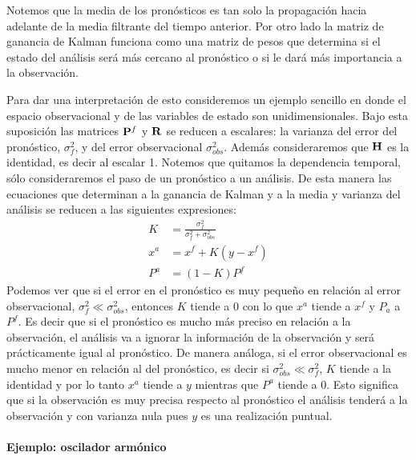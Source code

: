 Notemos que la media de los pronósticos es tan solo la propagación hacia adelante de la media filtrante del tiempo anterior. Por otro lado la matriz de ganancia de Kalman funciona como una matriz de pesos que determina si el estado del análisis será más cercano al pronóstico o si le dará más importancia a la observación.

Para dar una interpretación de esto consideremos un ejemplo sencillo en donde el espacio observacional y de las variables de estado son unidimensionales. Bajo esta suposición las matrices $\mathbf{P}^f$ y $\mathbf{R}$ se reducen a escalares: la varianza del error del pronóstico, $\sigma_f^2$, y del error observacional $\sigma_{obs}^2$. Además consideraremos que $\mathbf{H}$ es la identidad, es decir al escalar 1. Notemos que quitamos la dependencia temporal, sólo consideraremos el paso de un pronóstico a un análisis. De esta manera las ecuaciones que determinan a la ganancia de Kalman y a la media y varianza del análisis se reducen a las siguientes expresiones:
\begin{align}
    K &= \frac{\sigma_f^2}{\sigma_f^2 + \sigma_{obs}^2} \\ 
    x^a &=  x^f + K (y - x^f) \\ 
    P^a &= (1 - K)  P^f
\end{align}
Podemos ver que si el error en el pronóstico es muy pequeño en relación al error observacional, $\sigma_f^2 \ll \sigma_{obs}^2$, entonces $K$ tiende a 0 con lo que $x^a$ tiende a $x^f$ y $P_a$ a $P^f$. Es decir que si el pronóstico es mucho más preciso en relación a la observación, el análisis va a ignorar la información de la observación y será prácticamente igual al pronóstico. De manera análoga, si el error observacional es mucho menor en relación al del pronóstico, es decir si $\sigma_{obs}^2 \ll \sigma_f^2$, $K$ tiende a la identidad y por lo tanto $x^a$ tiende a $y$ mientras que $P^a$ tiende a 0. Esto significa que si la observación es muy precisa respecto al pronóstico el análisis tenderá a la observación y con varianza nula pues $y$ es una realización puntual.

\paragraph{Ejemplo: oscilador armónico} \

